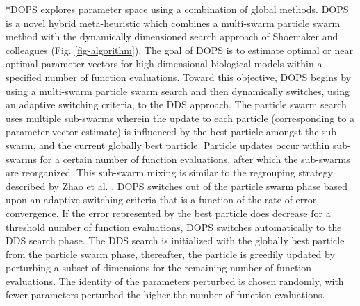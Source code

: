 \documentclass[12pt]{article}
\makeatletter
\renewcommand\subsection{\@startsection
	{subsection}{2}{0mm}
	{-0.05in}
	{-0.5\baselineskip}
	{\normalfont\normalsize\bfseries}}
\makeatother
\begin{document}
\subsection*{DOPS explores parameter space using a combination of global methods.}
DOPS is a novel hybrid meta-heuristic which combines a multi-swarm particle swarm method with the dynamically dimensioned search approach of Shoemaker and colleagues (Fig. \ref{fig-algorithm}).
The goal of DOPS is to estimate optimal or near optimal parameter vectors for high-dimensional biological models within a specified number of function evaluations.
Toward this objective, DOPS begins by using a multi-swarm particle swarm search and then dynamically switches, using an adaptive switching criteria, to the DDS approach.
The particle swarm search uses multiple sub-swarms wherein the update to each particle (corresponding to a parameter vector estimate) is influenced by the best particle amongst the sub-swarm, and the current globally best particle.
Particle updates occur within sub-swarms for a certain number of function evaluations, after which the sub-swarms are reorganized.
This sub-swarm mixing is similar to the regrouping strategy described by Zhao et al. \cite{zhao2008dynamic}. DOPS switches out of the particle swarm phase based upon an adaptive switching criteria that is a function of the rate of error convergence.
If the error represented by the best particle does decrease for a threshold number of function evaluations, DOPS switches automatically to the DDS search phase.
The DDS search is initialized with the globally best particle from the particle swarm phase, thereafter, the particle is greedily updated by perturbing a subset of dimensions for the remaining number of function evaluations.
The identity of the parameters perturbed is chosen randomly, with fewer parameters perturbed the higher the number of function evaluations.

\end{document}

